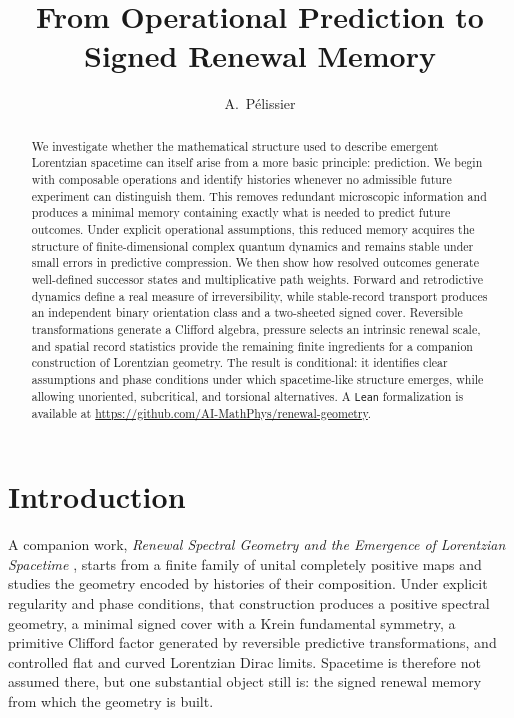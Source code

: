 \documentclass[11pt]{article}
\title{\textbf{From Operational Prediction to Signed Renewal Memory}}
\author{A.~P\'elissier}
\date{}
\theoremstyle{definition}
\theoremstyle{remark}
\begin{document}
\maketitle

\begin{abstract}
We investigate whether the mathematical structure used to describe emergent Lorentzian spacetime can itself arise from a more basic principle: prediction. We begin with composable operations and identify histories whenever no admissible future experiment can distinguish them. This removes redundant microscopic information and produces a minimal memory containing exactly what is needed to predict future outcomes. Under explicit operational assumptions, this reduced memory acquires the structure of finite-dimensional complex quantum dynamics and remains stable under small errors in predictive compression.
%
We then show how resolved outcomes generate well-defined successor states and multiplicative path weights. Forward and retrodictive dynamics define a real measure of irreversibility, while stable-record transport produces an independent binary orientation class and a two-sheeted signed cover. Reversible transformations generate a Clifford algebra, pressure selects an intrinsic renewal scale, and spatial record statistics provide the remaining finite ingredients for a companion construction of Lorentzian geometry.
%
The result is conditional: it identifies clear assumptions and phase conditions under which spacetime-like structure emerges, while allowing unoriented, subcritical, and torsional alternatives.
%
A \texttt{Lean} formalization is available at
\url{https://github.com/AI-MathPhys/renewal-geometry}.
\end{abstract}



\setcounter{tocdepth}{2}
\tableofcontents

\section{Introduction}
\label{sec:introduction}

A companion work, \emph{Renewal Spectral Geometry and the Emergence of
Lorentzian Spacetime} \cite{PelissierLorentzian2026}, starts from a finite
family of unital completely positive maps and studies the geometry encoded by
histories of their composition.  Under explicit regularity and phase
conditions, that construction produces a positive spectral geometry, a
minimal signed cover with a Krein fundamental symmetry, a primitive Clifford
factor generated by reversible predictive transformations, and controlled
flat and curved Lorentzian Dirac limits.  Spacetime is therefore not assumed
there, but one substantial object still is: the signed renewal memory from
which the geometry is built.
\end{document}
